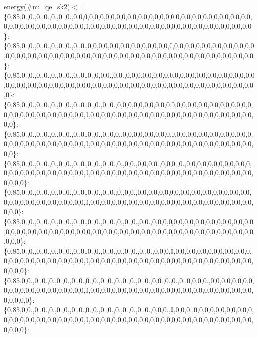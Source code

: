 energy(\#nu\+\_\+qe\+\_\+sk2)$<$  = \{0,85,0.,0.,0.,0.,0.,0.,0.,0,0,0,0,0,0,0,0,0,0,0,0,0,0,0,0,0,0,0,0,0,0,0,0,0,0,0,0,0,0,0,0,0,0,0,0,0,0,0,0,0,0,0,0,0,0,0,0,0,0,0,0,0,0,0,0,0,0,0,0,0,0,0,0,0,0,0,0,0,0,0,0,0,0,0,0,0,0,0\}\+: \{0,85,0.,0.,0.,0.,0.,0.,0.,0.,0.,0,0,0,0,0,0,0,0,0,0,0,0,0,0,0,0,0,0,0,0,0,0,0,0,0,0,0,0,0,0,0,0,0,0,0,0,0,0,0,0,0,0,0,0,0,0,0,0,0,0,0,0,0,0,0,0,0,0,0,0,0,0,0,0,0,0,0,0,0,0,0,0,0,0,0,0,0\}\+: \{0,85,0.,0.,0.,0.,0.,0.,0.,0.,0.,0.,0,0,0.,0,0.,0,0,0,0,0,0,0,0,0,0,0,0,0,0,0,0,0,0,0,0,0,0,0,0,0,0,0,0,0,0,0,0,0,0,0,0,0,0,0,0,0,0,0,0,0,0,0,0,0,0,0,0,0,0,0,0,0,0,0,0,0,0,0,0,0,0,0,0,0,0,0\}\+: \{0,85,0.,0.,0.,0.,0.,0.,0.,0.,0.,0.,0.,0.,0.,0,0,0,0,0,0,0,0,0,0,0,0,0,0,0,0,0,0,0,0,0,0,0,0,0,0,0,0,0,0,0,0,0,0,0,0,0,0,0,0,0,0,0,0,0,0,0,0,0,0,0,0,0,0,0,0,0,0,0,0,0,0,0,0,0,0,0,0,0,0,0,0,0\}\+: \{0,85,0.,0.,0.,0.,0.,0.,0.,0.,0.,0.,0.,0.,0,0.,0,0,0,0,0,0,0,0,0,0,0,0,0,0,0,0,0,0,0,0,0,0,0,0,0,0,0,0,0,0,0,0,0,0,0,0,0,0,0,0,0,0,0,0,0,0,0,0,0,0,0,0,0,0,0,0,0,0,0,0,0,0,0,0,0,0,0,0,0,0,0,0\}\+: \{0,85,0.,0.,0.,0.,0.,0.,0.,0.,0.,0.,0.,0.,0.,0.,0,0.,0,0,0,0.,0,0,0.,0.,0,0,0,0,0,0,0,0,0,0,0,0,0,0,0,0,0,0,0,0,0,0,0,0,0,0,0,0,0,0,0,0,0,0,0,0,0,0,0,0,0,0,0,0,0,0,0,0,0,0,0,0,0,0,0,0,0,0,0,0,0,0\}\+: \{0,85,0.,0.,0.,0.,0.,0.,0.,0.,0.,0.,0.,0.,0.,0.,0,0.,0,0,0,0,0,0,0,0,0,0,0,0,0,0,0,0,0,0,0,0,0,0,0,0,0,0,0,0,0,0,0,0,0,0,0,0,0,0,0,0,0,0,0,0,0,0,0,0,0,0,0,0,0,0,0,0,0,0,0,0,0,0,0,0,0,0,0,0,0,0\}\+: \{0,85,0.,0.,0.,0.,0.,0.,0.,0.,0.,0.,0.,0.,0.,0.,0.,0.,0,0.,0,0,0,0,0,0,0,0,0,0,0,0,0,0,0,0,0,0,0,0,0,0,0,0,0,0,0,0,0,0,0,0,0,0,0,0,0,0,0,0,0,0,0,0,0,0,0,0,0,0,0,0,0,0,0,0,0,0,0,0,0,0,0,0,0,0,0,0\}\+: \{0,85,0.,0.,0.,0.,0.,0.,0.,0.,0.,0.,0.,0.,0.,0.,0.,0.,0.,0.,0,0,0,0,0,0,0,0,0,0,0,0,0,0,0,0,0,0,0,0,0,0,0,0,0,0,0,0,0,0,0,0,0,0,0,0,0,0,0,0,0,0,0,0,0,0,0,0,0,0,0,0,0,0,0,0,0,0,0,0,0,0,0,0,0,0,0,0\}\+: \{0,85,0,0.,0.,0.,0.,0.,0.,0.,0.,0.,0.,0.,0.,0.,0.,0.,0.,0.,0,0.,0.,0.,0.,0,0,0,0.,0,0,0,0,0,0,0,0,0,0,0,0,0,0,0,0,0,0,0,0,0,0,0,0,0,0,0,0,0,0,0,0,0,0,0,0,0,0,0,0,0,0,0,0,0,0,0,0,0,0,0,0,0,0,0,0,0,0,0\}\+: \{0,85,0,0.,0.,0.,0.,0.,0.,0.,0.,0.,0.,0.,0.,0.,0.,0.,0.,0.,0,0,0.,0,0,0,0.,0,0,0,0,0,0,0,0,0,0,0,0,0,0,0,0,0,0,0,0,0,0,0,0,0,0,0,0,0,0,0,0,0,0,0,0,0,0,0,0,0,0,0,0,0,0,0,0,0,0,0,0,0,0,0,0,0,0,0,0,0\}\+: 